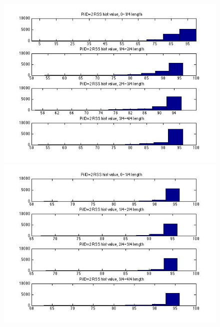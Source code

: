 \documentclass[10pt,conference]{IEEEtran}
\begin{document}
\begin{figure}[htbp]
\centering
\begin{minipage}[t]{0.2\textwidth}
	\centering
	\includegraphics[scale=0.2]{time2-5}
\end{minipage}
\begin{minipage}[t]{0.2\textwidth}
	\centering
	\includegraphics[scale=0.2]{time2-6}
\end{minipage}
\begin{minipage}[t]{0.2\textwidth}
	\centering

\end{minipage}
\end{figure}
\end{document}

